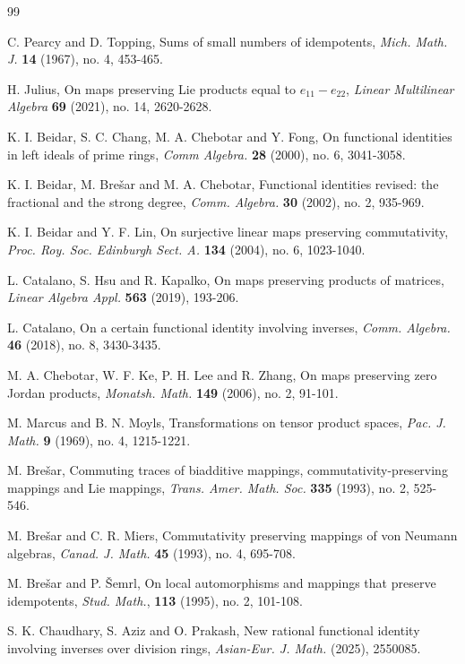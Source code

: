 \documentclass{amsart}
\theoremstyle{definition}
\theoremstyle{remark}
\numberwithin{equation}{section}
\begin{document}
\begin{thebibliography}{99}

 C. Pearcy and D. Topping, Sums of small numbers of idempotents, {\it Mich. Math. J.} {\bf{14}} (1967), no. 4, 453-465.

 H. Julius, On maps preserving Lie products equal to $e_{11}-e_{22}$, {\it Linear Multilinear Algebra} {\bf{69}} (2021), no. 14, 2620-2628.

 K. I. Beidar, S. C. Chang, M. A. Chebotar and Y. Fong, On functional identities in left ideals of prime rings, {\it Comm Algebra.} {\bf{28}} (2000), no. 6, 3041-3058.

 K. I. Beidar, M. Bre{\v{s}}ar and M. A. Chebotar, Functional identities revised: the fractional and the strong degree, {\it Comm. Algebra.} {\bf{30}} (2002), no. 2, 935-969.
	
 K. I. Beidar and Y. F. Lin, On surjective linear maps preserving commutativity, {\it Proc. Roy. Soc. Edinburgh Sect. A.} {\bf{134}} (2004), no. 6, 1023-1040.
		
 L. Catalano, S. Hsu and R. Kapalko, On maps preserving products of matrices, {\it Linear Algebra Appl.} {\bf{563}} (2019), 193-206.

 L. Catalano, On a certain functional identity involving inverses, {\it Comm. Algebra.} {\bf{46}} (2018), no. 8, 3430-3435.

 M. A. Chebotar, W. F. Ke, P. H. Lee and R. Zhang, On maps preserving zero Jordan products, {\it Monatsh. Math.} {\bf{149}} (2006), no. 2, 91-101. 

  M. Marcus and B. N. Moyls, Transformations on tensor product spaces, {\it Pac. J. Math.} {\bf{9}} (1969), no. 4, 1215-1221.

 M. Bre{\v{s}}ar, Commuting traces of biadditive mappings, commutativity-preserving mappings and Lie mappings, {\it Trans. Amer. Math. Soc.} {\bf{335}} (1993), no. 2, 525-546.

 M. Bre{\v{s}}ar and C. R. Miers, Commutativity preserving mappings of von Neumann algebras, {\it Canad. J. Math.} {\bf{45}} (1993), no. 4, 695-708.

 M. Bre{\v{s}}ar and P. {\v{S}}emrl, On local automorphisms and mappings that preserve idempotents, {\it Stud. Math.}, {\bf{113}} (1995), no. 2, 101-108.

 S. K. Chaudhary, S. Aziz and O. Prakash, New rational functional identity involving inverses over division rings, {\it Asian-Eur. J. Math.} (2025), 2550085.


\end{thebibliography}
\end{document}
